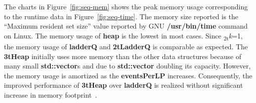 The charts in Figure~\ref{fig:seq-mem} shows the peak memory usage corresponding to the runtime data in Figure~\ref{fig:seq-time}. The
memory size reported is the ``Maximum resident set size'' value reported by GNU \textbf{/usr/bin/time} command on Linux. The memory usage
of \textbf{heap} is the lowest in most cases. Since \textsubscript{2t}\textit{k}=1, the memory usage of \textbf{ladderQ} and \textbf{2tLadderQ} is comparable as expected. The \textbf{3tHeap} initially uses more memory than the other data structures because of many small \textbf{std::vector}s and due to \textbf{std::vector} doubling its capacity.  However, the memory usage is amortized as the \textbf{eventsPerLP} increases. Consequently, the improved performance of \textbf{3tHeap} over \textbf{ladderQ} is realized without significant increase in memory footprint~\cite{higiro2017multi}.

